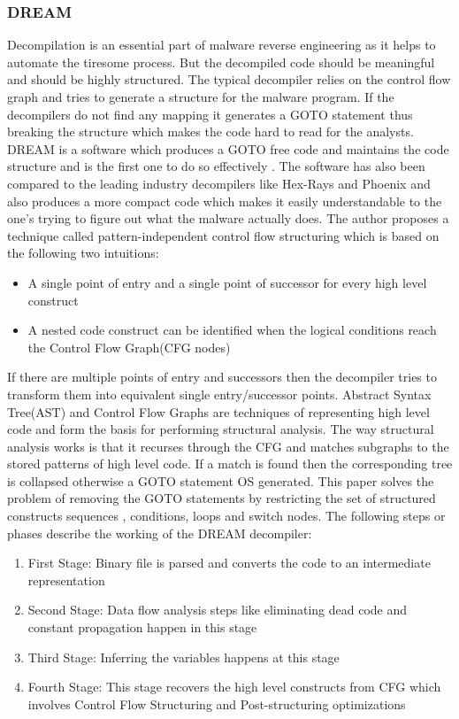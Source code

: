 \documentclass[11pt]{article}
\begin{document}
		\subsubsection{DREAM}
		
		Decompilation is an essential part of malware reverse engineering as it helps to automate the tiresome process. But the decompiled code should be meaningful and should be highly structured. The typical decompiler relies on the control flow graph and tries to generate a structure for the malware program. If the decompilers do not find any mapping it generates a GOTO statement thus breaking the structure which makes the code hard to read for the analysts. DREAM is a software which produces a GOTO free code and maintains the code structure and is the first one to do so effectively . The software has also been compared to the leading industry decompilers like Hex-Rays and Phoenix and also produces a more compact code which makes it easily understandable to the one’s trying to figure out what the malware actually does. The author proposes a technique called pattern-independent control flow structuring which is based on the following two intuitions:
		\begin{itemize}
			\item A single point of entry and a single point of successor for every high level construct
			\item A nested code construct can be identified when the logical conditions reach the Control Flow Graph(CFG nodes)
		\end{itemize}
		If there are multiple points of entry and successors then the decompiler tries to transform them into equivalent single entry/successor points. Abstract Syntax Tree(AST) and Control Flow Graphs are techniques of representing high level code and form the basis for performing  structural analysis. The way structural analysis works is that it recurses through the CFG and matches subgraphs to the stored patterns of high level code. If a match is found then the corresponding tree is collapsed otherwise a GOTO statement OS generated. This paper solves the problem of removing the GOTO statements by restricting the set of structured constructs sequences , conditions, loops and switch nodes. The following steps or phases describe the working of the DREAM decompiler:
		\begin{enumerate}
			\item First Stage: Binary file is parsed and converts the code to an intermediate representation
			\item Second Stage: Data flow analysis steps like eliminating dead code and constant propagation happen in this stage
			\item Third Stage: Inferring the variables happens at this stage
			\item Fourth Stage: This stage recovers the high level constructs from CFG which involves Control Flow Structuring and Post-structuring optimizations
		\end{enumerate}
\end{document}
